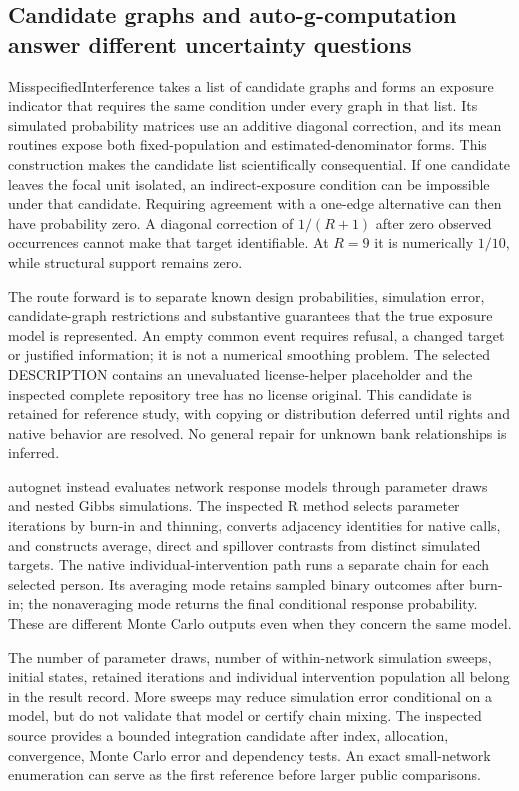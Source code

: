 \subsection{Candidate graphs and auto-g-computation answer different uncertainty questions}

MisspecifiedInterference takes a list of candidate graphs and forms an exposure indicator that requires the same condition under every graph in that list. Its simulated probability matrices use an additive diagonal correction, and its mean routines expose both fixed-population and estimated-denominator forms. This construction makes the candidate list scientifically consequential. If one candidate leaves the focal unit isolated, an indirect-exposure condition can be impossible under that candidate. Requiring agreement with a one-edge alternative can then have probability zero. A diagonal correction of $1/(R+1)$ after zero observed occurrences cannot make that target identifiable. At $R=9$ it is numerically $1/10$, while structural support remains zero.\citep{exec25_rnet_nmr,exec25_rnet_choice}

The route forward is to separate known design probabilities, simulation error, candidate-graph restrictions and substantive guarantees that the true exposure model is represented. An empty common event requires refusal, a changed target or justified information; it is not a numerical smoothing problem. The selected DESCRIPTION contains an unevaluated license-helper placeholder and the inspected complete repository tree has no license original. This candidate is retained for reference study, with copying or distribution deferred until rights and native behavior are resolved. No general repair for unknown bank relationships is inferred.\citep{exec25_rnet_nmr}

autognet instead evaluates network response models through parameter draws and nested Gibbs simulations. The inspected R method selects parameter iterations by burn-in and thinning, converts adjacency identities for native calls, and constructs average, direct and spillover contrasts from distinct simulated targets. The native individual-intervention path runs a separate chain for each selected person. Its averaging mode retains sampled binary outcomes after burn-in; the nonaveraging mode returns the final conditional response probability. These are different Monte Carlo outputs even when they concern the same model.\citep{exec25_rnet_auto}

The number of parameter draws, number of within-network simulation sweeps, initial states, retained iterations and individual intervention population all belong in the result record. More sweeps may reduce simulation error conditional on a model, but do not validate that model or certify chain mixing. The inspected source provides a bounded integration candidate after index, allocation, convergence, Monte Carlo error and dependency tests. An exact small-network enumeration can serve as the first reference before larger public comparisons.\citep{exec25_rnet_auto,exec25_rnet_choice}

